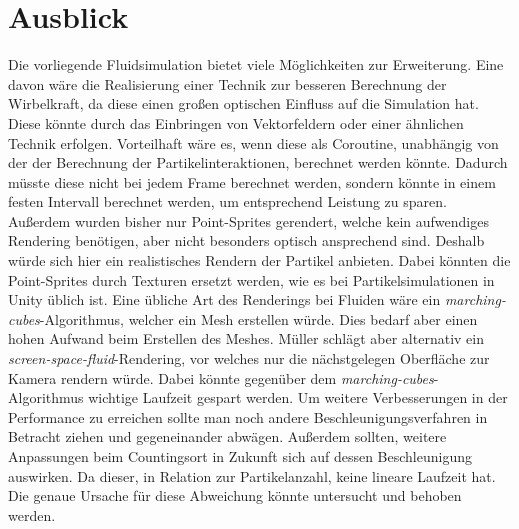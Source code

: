 \documentclass[intern,palatino]{cgBA}
\begin{document}
\section{Ausblick}\label{img:ausblick}

Die vorliegende Fluidsimulation bietet viele Möglichkeiten zur Erweiterung. Eine davon wäre die Realisierung einer Technik zur besseren Berechnung der Wirbelkraft, da diese einen großen optischen Einfluss auf die Simulation hat. Diese könnte durch das Einbringen von Vektorfeldern oder einer ähnlichen Technik erfolgen. Vorteilhaft wäre es, wenn diese als Coroutine, unabhängig von der der Berechnung der Partikelinteraktionen, berechnet werden könnte. Dadurch müsste diese nicht bei jedem Frame berechnet werden, sondern könnte in einem festen Intervall berechnet werden, um entsprechend Leistung zu sparen.
\newline
Außerdem wurden bisher nur Point-Sprites gerendert, welche kein aufwendiges Rendering benötigen, aber nicht besonders optisch ansprechend sind. Deshalb würde sich hier ein realistisches Rendern der Partikel anbieten. Dabei könnten die Point-Sprites durch Texturen ersetzt werden, wie es bei Partikelsimulationen in Unity üblich ist. Eine übliche Art des Renderings bei Fluiden wäre ein \textit{marching-cubes}-Algorithmus, welcher ein Mesh erstellen würde. Dies bedarf aber einen hohen Aufwand beim Erstellen des Meshes. Müller \cite{muller2007screen} schlägt aber alternativ ein \textit{screen-space-fluid}-Rendering, vor welches nur die nächstgelegen Oberfläche zur Kamera rendern würde. Dabei könnte gegenüber dem \textit{marching-cubes}-Algorithmus wichtige Laufzeit gespart werden.
\newline
Um weitere Verbesserungen in der Performance zu erreichen sollte man noch andere Beschleunigungsverfahren in Betracht ziehen und gegeneinander abwägen. Außerdem sollten, weitere Anpassungen beim Countingsort in Zukunft sich auf dessen Beschleunigung auswirken. Da dieser, in Relation zur Partikelanzahl, keine lineare Laufzeit hat. Die genaue Ursache für diese Abweichung könnte untersucht und behoben werden.

\newpage
\listoffigures
\newpage

\end{document}
